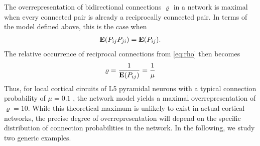 
The overrepresentation of bidirectional connections $\varrho$ in a network is maximal when every connected pair is already a reciprocally connected pair. In terms of the model defined above, this is the case when
\begin{align}
\operatorname{\mathbf{E}}(P_{ij} P_{ji}) = \operatorname{\mathbf{E}}(P_{ij}).
\end{align}
%
The relative occurrence of reciprocal connections from \eqref{eq:rho} then becomes
\begin{align}
\varrho = \frac{1}{\operatorname{\mathbf{E}}(P_{ij})} = \frac{1}{\mu} \label{eq:rho_max}
\end{align}
Thus, for local cortical circuits of L5 pyramidal neurons with a typical connection probability of $\mu = 0.1$ \cite{Thomson2002,Song2005}, the network model yields a maximal overrepresentation of $\varrho = 10$. While this theoretical maximum is unlikely to exist in actual cortical networks, the precise degree of overrepresentation will depend on the specific distribution of connection probabilities in the network. In the following, we study two generic examples.
